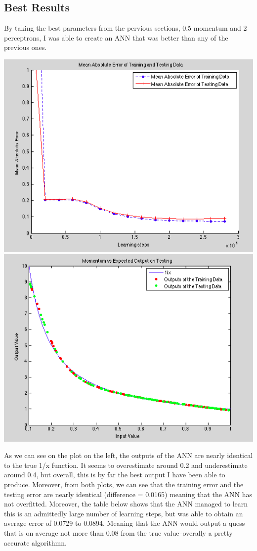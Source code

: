 \documentclass[epsfig]{article}
\begin{document}
 \subsection*{Best Results}
 By taking the best parameters from the pervious sections, 0.5 momentum and 2 perceptrons, I was able to create an ANN that was better than any of the previous ones.
 \begin{center}
\includegraphics[scale=0.45]{pic11}
\includegraphics[scale=0.45]{pic12}
 \end{center}
 As we can see on the plot on the left, the outputs of the ANN are nearly identical to the true 1/x function. It seems to overestimate around 0.2 and underestimate around 0.4, but overall, this is by far the best output I have been able to produce. Moreover, from both plots, we can see that the training error and the testing error are nearly identical (difference = 0.0165) meaning that the ANN has not overfitted. Moreover, the table below shows that the ANN managed to learn this is an admittedly large number of learning steps, but was able to obtain an average error of 0.0729 to 0.0894. Meaning that the ANN would output a quess that is on average not more than 0.08 from the true value--overally a pretty accurate algorithmn. \\
\end{document}
